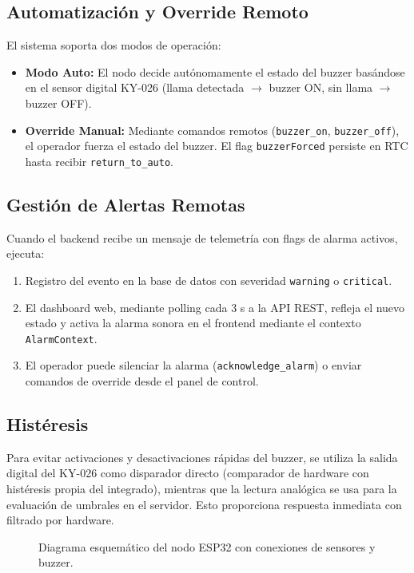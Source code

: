 \documentclass[11pt,a4paper]{article}
\begin{document}
\subsection{Automatización y Override Remoto}
El sistema soporta dos modos de operación:
\begin{itemize}
    \item \textbf{Modo Auto:} El nodo decide autónomamente el estado del buzzer basándose en el sensor digital KY-026 (llama detectada $\rightarrow$ buzzer ON, sin llama $\rightarrow$ buzzer OFF).
    \item \textbf{Override Manual:} Mediante comandos remotos (\texttt{buzzer\_on}, \texttt{buzzer\_off}), el operador fuerza el estado del buzzer. El flag \texttt{buzzerForced} persiste en RTC hasta recibir \texttt{return\_to\_auto}.
\end{itemize}

\subsection{Gestión de Alertas Remotas}
Cuando el backend recibe un mensaje de telemetría con flags de alarma activos, ejecuta:
\begin{enumerate}
    \item Registro del evento en la base de datos con severidad \texttt{warning} o \texttt{critical}.
    \item El dashboard web, mediante polling cada 3 s a la API REST, refleja el nuevo estado y activa la alarma sonora en el frontend mediante el contexto \texttt{AlarmContext}.
    \item El operador puede silenciar la alarma (\texttt{acknowledge\_alarm}) o enviar comandos de override desde el panel de control.
\end{enumerate}

\subsection{Histéresis}
Para evitar activaciones y desactivaciones rápidas del buzzer, se utiliza la salida digital del KY-026 como disparador directo (comparador de hardware con histéresis propia del integrado), mientras que la lectura analógica se usa para la evaluación de umbrales en el servidor. Esto proporciona respuesta inmediata con filtrado por hardware.

\begin{figure}[H]
    \centering
    \caption{Diagrama esquemático del nodo ESP32 con conexiones de sensores y buzzer.}
    \label{fig:esquematico_nodo}
\end{figure}
\end{document}
